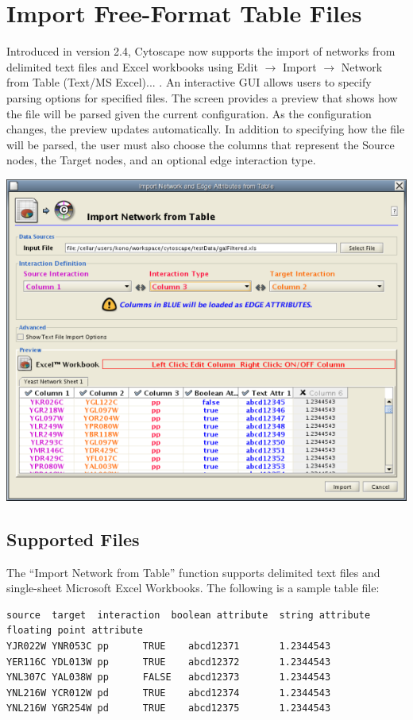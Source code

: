 \section{Import Free-Format Table Files}
 Introduced in version 2.4, Cytoscape now supports the import of networks from delimited text files and Excel workbooks using Edit $\rightarrow$ Import $\rightarrow$ Network from Table (Text/MS Excel)... . An interactive GUI allows users to specify parsing options for specified files. The screen provides a preview that shows how the file will be parsed given the current configuration. As the configuration changes, the preview updates automatically. In addition to specifying how the file will be parsed, the user must also choose the columns that represent the Source nodes, the Target nodes, and an optional edge interaction type. 

\begin{center}
 \includegraphics[wdith=\textwidth]{images/network_table_import.png} 
\end{center}

\subsection{Supported Files}
 The ``Import Network from Table'' function supports delimited text files and single-sheet Microsoft Excel Workbooks. The following is a sample table file: 

 \begin{verbatim}
source  target  interaction  boolean attribute  string attribute        floating point attribute
YJR022W YNR053C pp      TRUE    abcd12371       1.2344543
YER116C YDL013W pp      TRUE    abcd12372       1.2344543
YNL307C YAL038W pp      FALSE   abcd12373       1.2344543
YNL216W YCR012W pd      TRUE    abcd12374       1.2344543
YNL216W YGR254W pd      TRUE    abcd12375       1.2344543
\end{verbatim}

